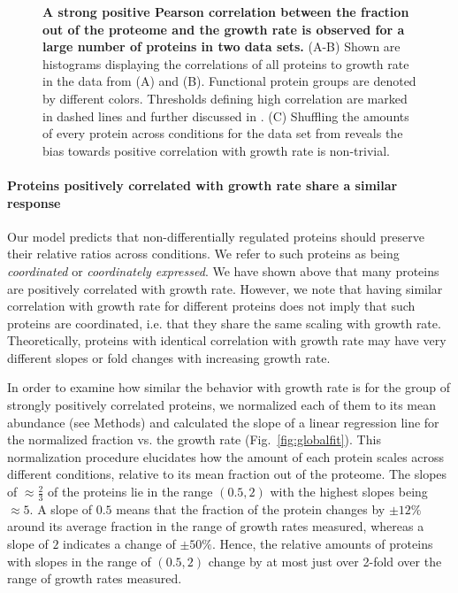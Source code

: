\documentclass[10pt,letterpaper]{article}
\begin{document}
\begin{figure}[h]
\begin{center}
\caption{\label{fig:growthcorr}
{\bf A strong positive Pearson correlation between the fraction out of the proteome and the growth rate is observed for a large number of proteins in two data sets.}
(A-B) Shown are histograms displaying the correlations of all proteins to growth rate in the data from \cite{Schmidt2015} (A) and \cite{Peebo_2015} (B).
Functional protein groups are denoted by different colors.
Thresholds defining high correlation are marked in dashed lines and further discussed in .
(C) Shuffling the amounts of every protein across conditions for the data set from \cite{Peebo_2015} reveals the bias towards positive correlation with growth rate is non-trivial.
%
}
\end{center}
\end{figure}

\paragraph{Proteins positively correlated with growth rate share a similar response}

Our model predicts that non-differentially regulated proteins should preserve their relative ratios across conditions.
We refer to such proteins as being \emph{coordinated} or \emph{coordinately expressed}.
We have shown above that many proteins are positively correlated with growth rate.
However, we note that having similar correlation with growth rate for different proteins does not imply that such proteins are coordinated, i.e. that they share the same scaling with growth rate.
Theoretically, proteins with identical correlation with growth rate may have very different slopes or fold changes with increasing growth rate.

In order to examine how similar the behavior with growth rate is for the group of strongly positively correlated proteins, we normalized each of them to its mean abundance (see Methods) and calculated the slope of a linear regression line for the normalized fraction vs. the growth rate (Fig.~\ref{fig:globalfit}).
This normalization procedure elucidates how the amount of each protein scales across different conditions, relative to its mean fraction out of the proteome.
The slopes of $\approx \frac{2}{3}$ of the proteins lie in the range $(0.5,2)$ with the highest slopes being $\approx 5$.
A slope of $0.5$ means that the fraction of the protein changes by $\pm12\%$ around its average fraction in the range of growth rates measured, whereas a slope of $2$ indicates a change of $\pm50\%$.
Hence, the relative amounts of proteins with slopes in the range of $(0.5,2)$ change by at most just over 2-fold over the range of growth rates measured.
\end{document}
